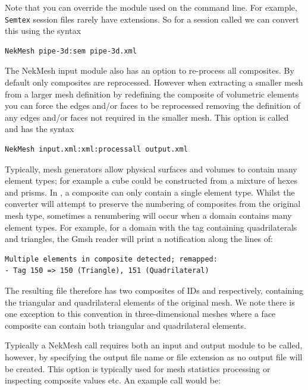 Note that you can override the module used on the command line. For example,
\texttt{Semtex} session files rarely have extensions. So for a session called
 we can convert this using the syntax
%
\begin{lstlisting}[style=BashInputStyle]
NekMesh pipe-3d:sem pipe-3d.xml
\end{lstlisting}

The NekMesh input module also has an option to re-process all
composites. By default only composites are reprocessed. However when
extracting a smaller mesh from a larger mesh definition by redefining
the composite of volumetric elements you can force the edges and/or
faces to be reprocessed removing the definition of any edges and/or
faces not required in the smaller mesh. This option is called
 and has the syntax

\begin{lstlisting}[style=BashInputStyle]
NekMesh input.xml:xml:processall output.xml 
\end{lstlisting}

Typically, mesh generators allow physical surfaces and volumes to contain many
element types; for example a cube could be constructed from a mixture of hexes
and prisms. In \nekpp, a composite can only contain a single element
type. Whilst the converter will attempt to preserve the numbering of composites
from the original mesh type, sometimes a renumbering will occur when a domain
contains many element types. For example, for a domain with the tag 
containing quadrilaterals and triangles, the Gmsh reader will print a
notification along the lines of:

\begin{lstlisting}[style=BashInputStyle]
Multiple elements in composite detected; remapped:
- Tag 150 => 150 (Triangle), 151 (Quadrilateral)
\end{lstlisting}

The resulting file therefore has two composites of IDs  and
 respectively, containing the triangular and quadrilateral
elements of the original mesh. We note there is one exception to this
convention in three-dimensional meshes where a face composite can
contain both triangular and quadrilateral elements.

Typically a NekMesh call requires both an input and output module to be
called, however, by specifying the output file name or file extension
as  no output file will be created. This option is typically
used for mesh statistics processing or inspecting composite values etc.
An example call would be:

